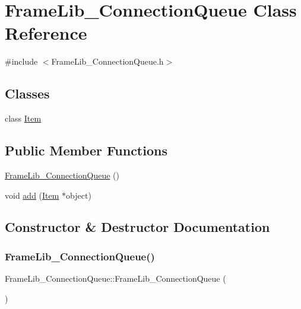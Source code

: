 \hypertarget{class_frame_lib___connection_queue}{}\section{Frame\+Lib\+\_\+\+Connection\+Queue Class Reference}
\label{class_frame_lib___connection_queue}


{\ttfamily \#include $<$Frame\+Lib\+\_\+\+Connection\+Queue.\+h$>$}

\subsection*{Classes}
\begin{DoxyCompactItemize}
\item 
class \hyperlink{class_frame_lib___connection_queue_1_1_item}{Item}
\end{DoxyCompactItemize}
\subsection*{Public Member Functions}
\begin{DoxyCompactItemize}
\item 
\hyperlink{class_frame_lib___connection_queue_ac7a10924c61ed46c6670eeda655877b4}{Frame\+Lib\+\_\+\+Connection\+Queue} ()
\item 
void \hyperlink{class_frame_lib___connection_queue_a8b41791b441ab59e16aea110ad5903d1}{add} (\hyperlink{class_frame_lib___connection_queue_1_1_item}{Item} $\ast$object)
\end{DoxyCompactItemize}


\subsection{Constructor \& Destructor Documentation}
\mbox{\label{class_frame_lib___connection_queue_ac7a10924c61ed46c6670eeda655877b4}} 
\subsubsection{\texorpdfstring{Frame\+Lib\+\_\+\+Connection\+Queue()}{FrameLib\_ConnectionQueue()}}
{\footnotesize\ttfamily Frame\+Lib\+\_\+\+Connection\+Queue\+::\+Frame\+Lib\+\_\+\+Connection\+Queue (\begin{DoxyParamCaption}{ }\end{DoxyParamCaption})\hspace{0.3cm}{\ttfamily [inline]}}



